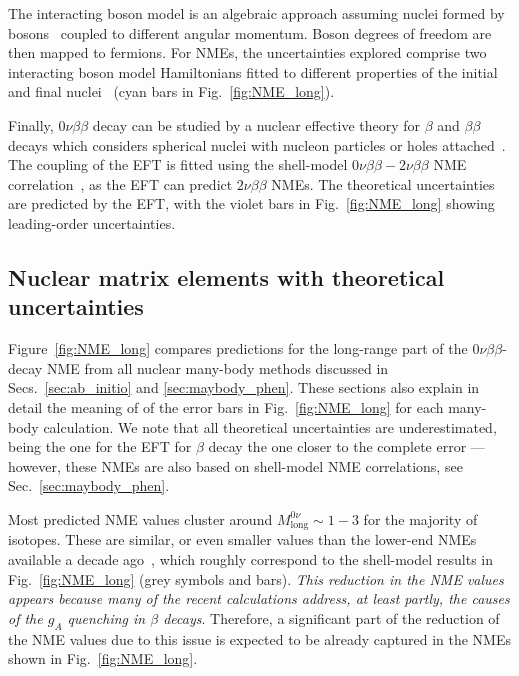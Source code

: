 The interacting boson model is an algebraic approach assuming nuclei formed by bosons~\cite{Iachello:2006fqa} coupled to different angular momentum. Boson degrees of freedom are then mapped to fermions. For NMEs, the uncertainties explored comprise two interacting boson model Hamiltonians fitted to different properties of the initial and final nuclei~\cite{Barea:2015kwa,Deppisch:2020ztt} (cyan bars in Fig.~\ref{fig:NME_long}).

Finally, $0\nu\beta\beta$ decay can be studied by a nuclear effective theory for $\beta$ and $\beta\beta$ decays which considers spherical nuclei with nucleon particles or holes attached~\cite{CoelloPerez:2017xsq,Brase:2021uny}. The coupling of the EFT is fitted using the shell-model $0\nu\beta\beta-2\nu\beta\beta$ NME correlation~\cite{Shimizu:2017qcy}, as the EFT can predict $2\nu\beta\beta$ NMEs. The theoretical uncertainties are predicted by the EFT, with the violet bars in Fig.~\ref{fig:NME_long} showing leading-order uncertainties.

\subsection{Nuclear matrix elements with theoretical uncertainties}
\label{subsec:nme_current}

Figure~\ref{fig:NME_long} compares predictions for the long-range part of the $0\nu\beta\beta$-decay NME from all nuclear many-body methods discussed in Secs.~\ref{sec:ab_initio} and \ref{sec:maybody_phen}. These sections also explain in detail the meaning of of the error bars in Fig.~\ref{fig:NME_long} for each many-body calculation. We note that all theoretical uncertainties are underestimated, being the one for the EFT for $\beta$ decay the one closer to the complete error ---however, these NMEs are also based on shell-model NME correlations, see Sec.~\ref{sec:maybody_phen}.

Most predicted NME values cluster around $M^{0\nu}_\text{long}\sim1-3$ for the majority of isotopes. These are similar, or even smaller values than the lower-end NMEs available a decade ago~\cite{Gomez-Cadenas:2010zcc}, which roughly correspond to the shell-model results in Fig.~\ref{fig:NME_long} (grey symbols and bars). {\it This reduction in the NME values appears because many of the recent calculations address, at least partly, the causes of the $g_A$ quenching in $\beta$ decays}. Therefore, a significant part of the reduction of the NME values due to this issue is expected to be already captured in the NMEs shown in Fig.~\ref{fig:NME_long}.


